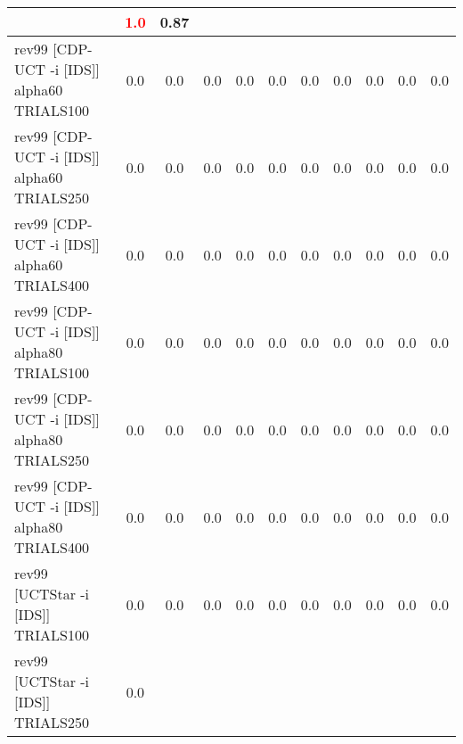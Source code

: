 \documentclass{article}
\begin{document}
\begin{tabular}{|l|r@{$\pm$}rr@{$\pm$}rr@{$\pm$}rr@{$\pm$}rr@{$\pm$}rr@{$\pm$}rr@{$\pm$}rr@{$\pm$}rr@{$\pm$}rr@{$\pm$}r|}
& \multicolumn{2}{c}{\textbf{\textcolor{red}{1.0}}}
& \multicolumn{2}{c|}{0.87}
\\
\hline
rev99 [CDP-UCT -i [IDS]] alpha60 TRIALS100
& \multicolumn{2}{c}{0.0}
& \multicolumn{2}{c}{0.0}
& \multicolumn{2}{c}{0.0}
& \multicolumn{2}{c}{0.0}
& \multicolumn{2}{c}{0.0}
& \multicolumn{2}{c}{0.0}
& \multicolumn{2}{c}{0.0}
& \multicolumn{2}{c}{0.0}
& \multicolumn{2}{c}{0.0}
& \multicolumn{2}{c|}{0.0}
\\
rev99 [CDP-UCT -i [IDS]] alpha60 TRIALS250
& \multicolumn{2}{c}{0.0}
& \multicolumn{2}{c}{0.0}
& \multicolumn{2}{c}{0.0}
& \multicolumn{2}{c}{0.0}
& \multicolumn{2}{c}{0.0}
& \multicolumn{2}{c}{0.0}
& \multicolumn{2}{c}{0.0}
& \multicolumn{2}{c}{0.0}
& \multicolumn{2}{c}{0.0}
& \multicolumn{2}{c|}{0.0}
\\
rev99 [CDP-UCT -i [IDS]] alpha60 TRIALS400
& \multicolumn{2}{c}{0.0}
& \multicolumn{2}{c}{0.0}
& \multicolumn{2}{c}{0.0}
& \multicolumn{2}{c}{0.0}
& \multicolumn{2}{c}{0.0}
& \multicolumn{2}{c}{0.0}
& \multicolumn{2}{c}{0.0}
& \multicolumn{2}{c}{0.0}
& \multicolumn{2}{c}{0.0}
& \multicolumn{2}{c|}{0.0}
\\
rev99 [CDP-UCT -i [IDS]] alpha80 TRIALS100
& \multicolumn{2}{c}{0.0}
& \multicolumn{2}{c}{0.0}
& \multicolumn{2}{c}{0.0}
& \multicolumn{2}{c}{0.0}
& \multicolumn{2}{c}{0.0}
& \multicolumn{2}{c}{0.0}
& \multicolumn{2}{c}{0.0}
& \multicolumn{2}{c}{0.0}
& \multicolumn{2}{c}{0.0}
& \multicolumn{2}{c|}{0.0}
\\
rev99 [CDP-UCT -i [IDS]] alpha80 TRIALS250
& \multicolumn{2}{c}{0.0}
& \multicolumn{2}{c}{0.0}
& \multicolumn{2}{c}{0.0}
& \multicolumn{2}{c}{0.0}
& \multicolumn{2}{c}{0.0}
& \multicolumn{2}{c}{0.0}
& \multicolumn{2}{c}{0.0}
& \multicolumn{2}{c}{0.0}
& \multicolumn{2}{c}{0.0}
& \multicolumn{2}{c|}{0.0}
\\
rev99 [CDP-UCT -i [IDS]] alpha80 TRIALS400
& \multicolumn{2}{c}{0.0}
& \multicolumn{2}{c}{0.0}
& \multicolumn{2}{c}{0.0}
& \multicolumn{2}{c}{0.0}
& \multicolumn{2}{c}{0.0}
& \multicolumn{2}{c}{0.0}
& \multicolumn{2}{c}{0.0}
& \multicolumn{2}{c}{0.0}
& \multicolumn{2}{c}{0.0}
& \multicolumn{2}{c|}{0.0}
\\
rev99 [UCTStar -i [IDS]] TRIALS100
& \multicolumn{2}{c}{0.0}
& \multicolumn{2}{c}{0.0}
& \multicolumn{2}{c}{0.0}
& \multicolumn{2}{c}{0.0}
& \multicolumn{2}{c}{0.0}
& \multicolumn{2}{c}{0.0}
& \multicolumn{2}{c}{0.0}
& \multicolumn{2}{c}{0.0}
& \multicolumn{2}{c}{0.0}
& \multicolumn{2}{c|}{0.0}
\\
rev99 [UCTStar -i [IDS]] TRIALS250
& \multicolumn{2}{c}{0.0}

\end{tabular}
\end{document}
